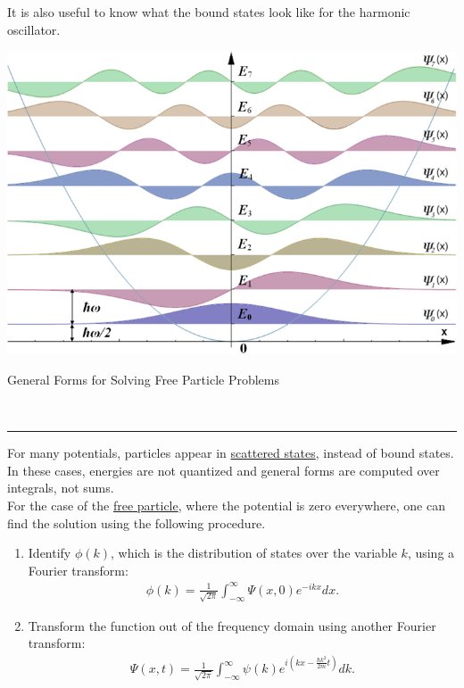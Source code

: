 \documentclass{article}
\newcommand{\header}[1]{\begin{large}\noindent #1\end{large}\\\rule{\textwidth}{0.5pt}}
\newcommand{\gap}{\medskip\\}
\begin{document}
    It is also useful to know what the bound states look like for
    the harmonic oscillator.

    \begin{center}
        \includegraphics[scale=0.3]{harmonic-oscillator-states.png}
    \end{center}

    \header{General Forms for Solving Free Particle Problems}

    For many potentials, particles appear in \underline{scattered states},
    instead of bound states. In these cases, energies are not quantized
    and general forms are computed over integrals, not sums.
    \gap
    For the case of the \underline{free particle}, where the 
    potential is zero everywhere, one can find the solution using the
    following procedure.
    \begin{enumerate}
        \item Identify $\phi(k)$, which is the distribution of states 
        over the variable $k$, using a Fourier transform:
        \begin{align*}
            \phi(k) = \frac{1}{\sqrt{2\pi}} \int_{-\infty}^{\infty}\Psi(x, 0)e^{-ikx}dx.
        \end{align*}
        \item Transform the function out of the frequency domain using 
        another Fourier transform:
        \begin{align*}
            \Psi(x,t) = \frac{1}{\sqrt{2\pi}}\int_{-\infty}^{\infty} \psi(k) e^{i\left(kx - \frac{\hbar k^2}{2m}t\right)} dk.
        \end{align*}
    \end{enumerate}
\end{document}
